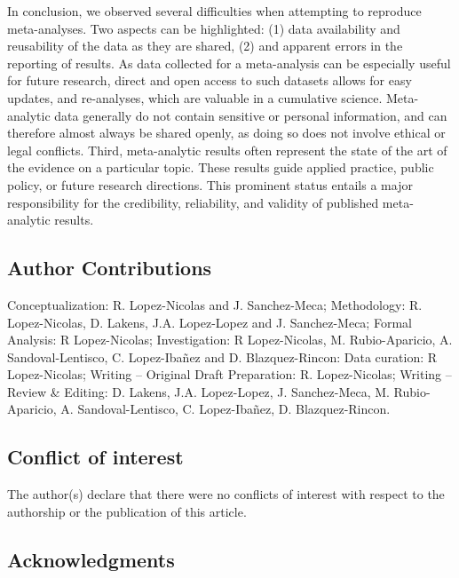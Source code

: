 \documentclass[
  ,man,floatsintext]{apa6}
\begin{document}
In conclusion, we observed several difficulties when attempting to reproduce meta-analyses. Two aspects can be highlighted: (1) data availability and reusability of the data as they are shared, (2) and apparent errors in the reporting of results. As data collected for a meta-analysis can be especially useful for future research, direct and open access to such datasets allows for easy updates, and re-analyses, which are valuable in a cumulative science. Meta-analytic data generally do not contain sensitive or personal information, and can therefore almost always be shared openly, as doing so does not involve ethical or legal conflicts. Third, meta-analytic results often represent the state of the art of the evidence on a particular topic. These results guide applied practice, public policy, or future research directions. This prominent status entails a major responsibility for the credibility, reliability, and validity of published meta-analytic results.

\hypertarget{author-contributions}{%
\subsection{Author Contributions}\label{author-contributions}}

Conceptualization: R. Lopez-Nicolas and J. Sanchez-Meca; Methodology: R. Lopez-Nicolas, D. Lakens, J.A. Lopez-Lopez and J. Sanchez-Meca; Formal Analysis: R Lopez-Nicolas; Investigation: R Lopez-Nicolas, M. Rubio-Aparicio, A. Sandoval-Lentisco, C. Lopez-Ibañez and D. Blazquez-Rincon: Data curation: R Lopez-Nicolas; Writing -- Original Draft Preparation: R. Lopez-Nicolas; Writing -- Review \& Editing: D. Lakens, J.A. Lopez-Lopez, J. Sanchez-Meca, M. Rubio-Aparicio, A. Sandoval-Lentisco, C. Lopez-Ibañez, D. Blazquez-Rincon.

\hypertarget{conflict-of-interest}{%
\subsection{Conflict of interest}\label{conflict-of-interest}}

The author(s) declare that there were no conflicts of interest with respect to the authorship or the publication of this article.

\hypertarget{acknowledgments}{%
\subsection{Acknowledgments}\label{acknowledgments}}
\end{document}
